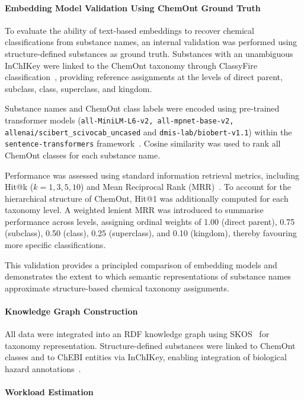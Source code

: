 \paragraph{Embedding Model Validation Using ChemOnt Ground Truth}
\label{sec:chemont_validation}

To evaluate the ability of text-based embeddings to recover chemical
classifications from substance names, an internal validation was performed
using structure-defined substances as ground truth. Substances with an
unambiguous InChIKey were linked to the ChemOnt taxonomy through ClassyFire
classification~\cite{DjoumbouFeunang2016}, providing reference assignments at
the levels of direct parent, subclass, class, superclass, and kingdom.

Substance names and ChemOnt class labels were encoded using pre-trained
transformer models (\texttt{all-MiniLM-L6-v2, all-mpnet-base-v2, allenai/scibert\_scivocab\_uncased} 
and \texttt{dmis-lab/biobert-v1.1}) within the \texttt{sentence-transformers}
framework~\cite{Reimers2019,Wang2020MiniLM,devlin-etal-2019-bert}. Cosine
similarity was used to rank all ChemOnt classes for each substance name.

Performance was assessed using standard information retrieval metrics,
including Hit@k ($k = 1, 3, 5, 10$) and Mean Reciprocal Rank (MRR)~\cite{Manning2008}.
To account for the hierarchical structure of ChemOnt, Hit@1 was additionally
computed for each taxonomy level. A weighted lenient MRR was introduced to
summarise performance across levels, assigning ordinal weights of 1.00 (direct
parent), 0.75 (subclass), 0.50 (class), 0.25 (superclass), and 0.10 (kingdom),
thereby favouring more specific classifications.

This validation provides a principled comparison of embedding models and
demonstrates the extent to which semantic representations of substance names
approximate structure-based chemical taxonomy assignments.

\paragraph{Knowledge Graph Construction}

All data were integrated into an RDF knowledge graph using SKOS~\cite{W3C2009SKOS} for taxonomy
representation. Structure-defined substances were linked to ChemOnt classes and
to ChEBI entities via InChIKey, enabling integration of biological hazard
annotations~\cite{W3C2017OA}.

\paragraph{Workload Estimation}

